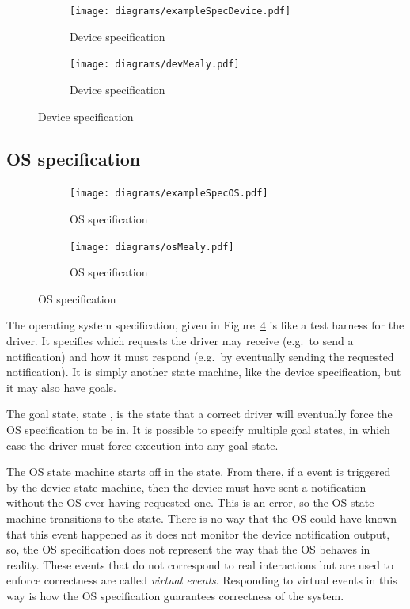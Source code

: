 \begin{figure}
\centering
\begin{subfigure}[t]{0.47\textwidth}
\texttt{[image: diagrams/exampleSpecDevice.pdf]}
\caption{Device specification}
\label{fig:dev_spec}
\end{subfigure}
\hfill
\begin{subfigure}[t]{0.47\textwidth}
\texttt{[image: diagrams/devMealy.pdf]}
\caption{Device specification}
\label{fig:dev_spec_mealy}
\end{subfigure}
\end{figure}

\subsection{OS specification}

\begin{figure}
\centering
\begin{subfigure}[t]{0.47\textwidth}
\texttt{[image: diagrams/exampleSpecOS.pdf]}
\caption{OS specification}
\label{fig:os_spec}
\end{subfigure}
\hfill
\begin{subfigure}[t]{0.47\textwidth}
\centering
\texttt{[image: diagrams/osMealy.pdf]}
\caption{OS specification}
\label{fig:os_spec_mealy}
\end{subfigure}
\end{figure}

The operating system specification, given in Figure~\ref{fig:os_spec} is like a test harness for the driver. It specifies which requests the driver may receive (e.g.\ to send a notification) and how it must respond (e.g.\ by eventually sending the requested notification). It is simply another state machine, like the device specification, but it may also have goals.

The goal state, state , is the state that a correct driver will eventually force the OS specification to be in. It is possible to specify multiple goal states, in which case the driver must force execution into any goal state.

The OS state machine starts off in the  state. From there, if a  event is triggered by the device state machine, then the device must have sent a notification without the OS ever having requested one. This is an error, so the OS state machine transitions to the  state. There is no way that the OS could have known that this event happened as it does not monitor the device notification output, so, the OS specification does not represent the way that the OS behaves in reality. These events that do not correspond to real interactions but are used to enforce correctness are called \emph{virtual events}. Responding to virtual events in this way is how the OS specification guarantees correctness of the system. 

